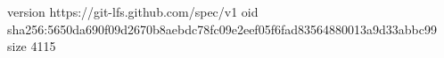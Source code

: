 version https://git-lfs.github.com/spec/v1
oid sha256:5650da690f09d2670b8aebdc78fc09e2eef05f6fad83564880013a9d33abbc99
size 4115
